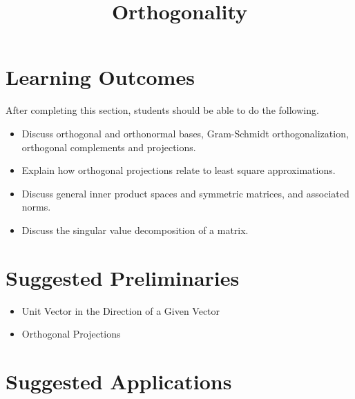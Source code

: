 \documentclass{ximera}
\title{Orthogonality}
\begin{document}
\begin{abstract}

\end{abstract}
 
\maketitle
 
\section*{Learning Outcomes}
After completing this section, students should be able to do the following.
 
\begin{itemize}
    \item Discuss orthogonal and orthonormal bases, Gram-Schmidt orthogonalization, orthogonal complements and projections. 
    \item Explain how orthogonal projections relate to least square approximations.
    \item Discuss general inner product spaces and symmetric matrices, and associated norms.
    \item Discuss the singular value decomposition of a matrix.
    
\end{itemize}
\section*{Suggested Preliminaries}
\begin{itemize}
    \item Unit Vector in the Direction of a Given Vector
    \item Orthogonal Projections
\end{itemize}

\section*{Suggested Applications}

 
\end{document}
